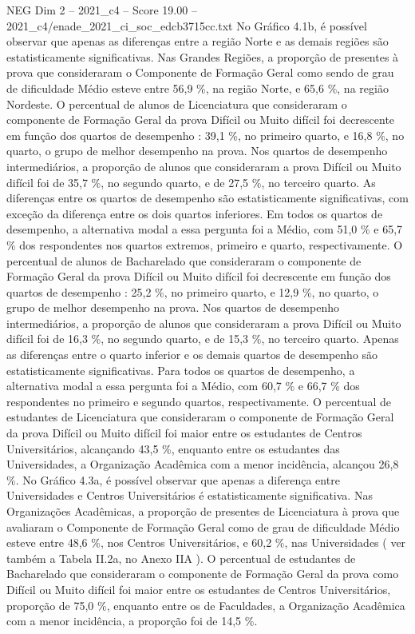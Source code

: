 \begin{textsample}{NEG Dim 2 – 2021\_c4 – Score 19.00 – 2021\_c4/enade\_2021\_ci\_soc\_edcb3715cc.txt}
No Gráfico 4.1b, é possível observar que apenas as diferenças entre a região Norte e as demais regiões são estatisticamente significativas.
Nas Grandes Regiões, a proporção de presentes à prova que consideraram o Componente de Formação Geral como sendo de grau de dificuldade Médio esteve entre 56,9 \%, na região Norte, e 65,6 \%, na região Nordeste.
O percentual de alunos de Licenciatura que consideraram o componente de Formação Geral da prova Difícil ou Muito difícil foi decrescente em função dos quartos de desempenho : 39,1 \%, no primeiro quarto, e 16,8 \%, no quarto, o grupo de melhor desempenho na prova.
Nos quartos de desempenho intermediários, a proporção de alunos que consideraram a prova Difícil ou Muito difícil foi de 35,7 \%, no segundo quarto, e de 27,5 \%, no terceiro quarto.
As diferenças entre os quartos de desempenho são estatisticamente significativas, com exceção da diferença entre os dois quartos inferiores.
Em todos os quartos de desempenho, a alternativa modal a essa pergunta foi a Médio, com 51,0 \% e 65,7 \% dos respondentes nos quartos extremos, primeiro e quarto, respectivamente.
O percentual de alunos de Bacharelado que consideraram o componente de Formação Geral da prova Difícil ou Muito difícil foi decrescente em função dos quartos de desempenho : 25,2 \%, no primeiro quarto, e 12,9 \%, no quarto, o grupo de melhor desempenho na prova.
Nos quartos de desempenho intermediários, a proporção de alunos que consideraram a prova Difícil ou Muito difícil foi de 16,3 \%, no segundo quarto, e de 15,3 \%, no terceiro quarto.
Apenas as diferenças entre o quarto inferior e os demais quartos de desempenho são estatisticamente significativas.
Para todos os quartos de desempenho, a alternativa modal a essa pergunta foi a Médio, com 60,7 \% e 66,7 \% dos respondentes no primeiro e segundo quartos, respectivamente.
O percentual de estudantes de Licenciatura que consideraram o componente de Formação Geral da prova Difícil ou Muito difícil foi maior entre os estudantes de Centros Universitários, alcançando 43,5 \%, enquanto entre os estudantes das Universidades, a Organização Acadêmica com a menor incidência, alcançou 26,8 \%.
No Gráfico 4.3a, é possível observar que apenas a diferença entre Universidades e Centros Universitários é estatisticamente significativa.
Nas Organizações Acadêmicas, a proporção de presentes de Licenciatura à prova que avaliaram o Componente de Formação Geral como de grau de dificuldade Médio esteve entre 48,6 \%, nos Centros Universitários, e 60,2 \%, nas Universidades ( ver também a Tabela II.2a, no Anexo IIA ).
O percentual de estudantes de Bacharelado que consideraram o componente de Formação Geral da prova como Difícil ou Muito difícil foi maior entre os estudantes de Centros Universitários, proporção de 75,0 \%, enquanto entre os de Faculdades, a Organização Acadêmica com a menor incidência, a proporção foi de 14,5 \%.

\end{textsample}
